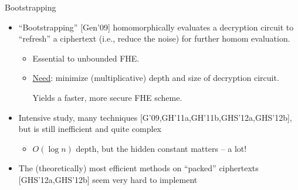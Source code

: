 \documentclass[shadow,xcolor=pdftex,svgnames,table,t]{beamer}
\begin{document}
\begin{frame}{Bootstrapping}
  \begin{itemize}
    \vfill
  \item ``Bootstrapping'' {\footnotesize [Gen'09]} homomorphically
    evaluates a decryption circuit to ``refresh'' a ciphertext (i.e.,
    reduce the noise) for further homom evaluation.

    \begin{itemize}
    \item \alert{Essential} to \alert{unbounded} FHE.

      \medskip
    \item \uline{Need}: minimize (multiplicative) \alert{depth} and
      \alert{size} of decryption circuit.

      Yields a faster, more secure FHE scheme.
    \end{itemize}

    \vfill

  \item Intensive study, many techniques {\footnotesize
      [G'09,GH'11a,GH'11b,GHS'12a,GHS'12b]}, but is still inefficient
    and quite complex
    \medskip

    \begin{itemize}
    \item $O(\log n)$ depth, but the hidden constant matters -- a lot!
    \end{itemize}

    \medskip 
  
  \item The (theoretically) most efficient methods on ``packed''
    ciphertexts {\footnotesize [GHS'12a,GHS'12b]} seem very hard to
    implement
    \vfill
  \end{itemize}
\end{frame}
\end{document}
